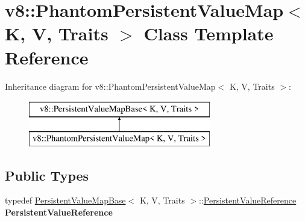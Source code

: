 \hypertarget{classv8_1_1_phantom_persistent_value_map}{}\section{v8\+:\+:Phantom\+Persistent\+Value\+Map$<$ K, V, Traits $>$ Class Template Reference}
\label{classv8_1_1_phantom_persistent_value_map}
Inheritance diagram for v8\+:\+:Phantom\+Persistent\+Value\+Map$<$ K, V, Traits $>$\+:\begin{figure}[H]
\begin{center}
\leavevmode
\includegraphics[height=2.000000cm]{classv8_1_1_phantom_persistent_value_map}
\end{center}
\end{figure}
\subsection*{Public Types}
\begin{DoxyCompactItemize}
\item 
\hypertarget{classv8_1_1_phantom_persistent_value_map_a1da7c4924af39d820a8adde8af8195b0}{}typedef \hyperlink{classv8_1_1_persistent_value_map_base}{Persistent\+Value\+Map\+Base}$<$ K, V, Traits $>$\+::\hyperlink{classv8_1_1_persistent_value_map_base_1_1_persistent_value_reference}{Persistent\+Value\+Reference} {\bfseries Persistent\+Value\+Reference}\label{classv8_1_1_phantom_persistent_value_map_a1da7c4924af39d820a8adde8af8195b0}

\end{DoxyCompactItemize}
